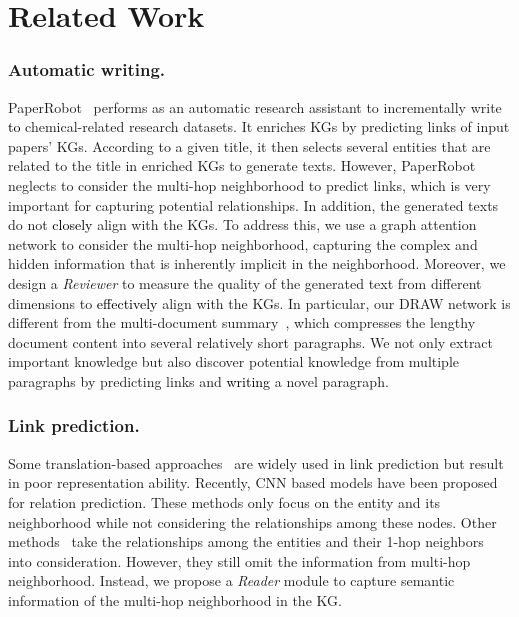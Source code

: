 \documentclass[letterpaper]{article}
\def\hmg{\textcolor{black}}
\begin{document}
\section{Related Work} 
\subsubsection{Automatic writing.}

PaperRobot~\cite{Wang2019PaperRobotID} performs as an automatic research assistant to incrementally write 
\hmg{to}
chemical-related research datasets. 
It enriches KGs by predicting links of input papers' KGs. According to a given title, it then selects several entities that are related to the title in enriched KGs to generate texts. 
However, PaperRobot neglects to consider the multi-hop neighborhood to predict links, which is very important for capturing potential relationships.
In addition, the generated texts do not \hmg{closely} align with the KGs.
To address this, we use a graph attention network to consider the multi-hop neighborhood, capturing the complex and hidden information that is inherently implicit in the neighborhood. 
Moreover, we design a \textit{Reviewer} to measure the quality of the generated text from different dimensions to \hmg{effectively} align with the {KGs}.
In particular, our DRAW network is different from the multi-document summary~\cite{Ling2013Multi}, which compresses the lengthy document content into several relatively short paragraphs. We not only extract important knowledge but also discover potential knowledge from multiple paragraphs by predicting links and \hmg{writing} a novel paragraph.


\subsubsection{Link prediction.}

Some translation-based approaches~\cite{NIPS2013_5071,wang_zhen,Lin2015LearningEA} are widely used in link prediction but result in poor {representation ability}.
Recently, CNN based models \cite{Dettmers2018Convolutional2K, Nguyen2018ANE} have been proposed for relation prediction.
{These methods only focus on the entity and its neighborhood while not considering the relationships among these nodes.
Other methods~\cite{Kipf2017SemiSupervisedCW,inbook} take the relationships among the entities and their 1-hop neighbors into consideration. However, they still omit the information from multi-hop neighborhood.}
Instead, we propose a \textit{Reader} module to capture semantic information of the multi-hop neighborhood in the KG.
\end{document}
